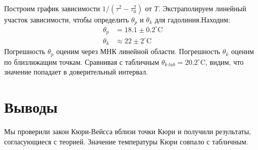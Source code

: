 \documentclass[12pt]{article}
\begin{document}
\begin{minipage}{.5\textwidth}
    Построим график зависимости $1 / (\tau^2 - \tau_0^2)$ от $T$. Экстраполируем линейный участок зависимости, чтобы определить $\theta_p$ и $\theta_k$ для гадолиния.Находим:
    \begin{align*}
        \theta_p &= 18.1 \pm  0.2^{\circ} \mathrm{C}\\
        \theta_k &\approx 22 \pm 2^{\circ} \mathrm{C}
    \end{align*}
    Погрешность $\theta_p$ оценим через МНК линейной области. Погрешность $\theta_k$ оценим по близлижащим точкам. Сравнивая с табличным $\theta_{k\: tab} = 20.2^{\circ} \mathrm{C}$, видим, что значение попадает в доверительный интервал.
    
\end{minipage}

\section{Выводы}

Мы проверили закон Кюри-Вейсса вблизи точки Кюри и получили результаты, согласующиеся с теорией. Значение температуры Кюри совпало с табличным. 
\end{document}
